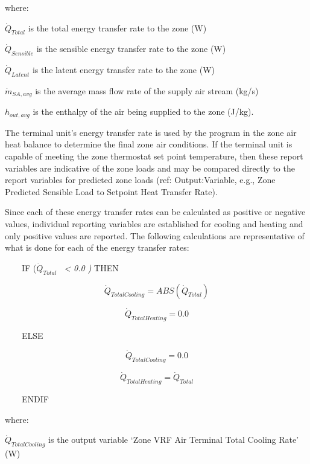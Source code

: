 where:

\(\dot{Q}_{Total}\) is the total energy transfer rate to the zone (W)

\(\dot{Q}_{Sensible}\) is the sensible energy transfer rate to the zone (W)

\(\dot{Q}_{Latent}\) is the latent energy transfer rate to the zone (W)

\(\dot{m}_{SA,avg}\) is the average mass flow rate of the supply air stream (kg/s)

\(h_{out,avg}\) is the enthalpy of the air being supplied to the zone (J/kg).

The terminal unit's energy transfer rate is used by the program in the zone air heat balance to determine the final zone air conditions. If the terminal unit is capable of meeting the zone thermostat set point temperature, then these report variables are indicative of the zone loads and may be compared directly to the report variables for predicted zone loads (ref: Output:Variable, e.g., Zone Predicted Sensible Load to Setpoint Heat Transfer Rate).

Since each of these energy transfer rates can be calculated as positive or negative values, individual reporting variables are established for cooling and heating and only positive values are reported. The following calculations are representative of what is done for each of the energy transfer rates:

~~~~IF (\({\dot Q_{Total}}\) \emph{~\textless{} 0.0 )} THEN

\begin{equation}
{\dot Q_{TotalCooling}} = ABS ({\dot Q_{Total}})
\end{equation}

\begin{equation}
{\dot Q_{TotalHeating}} = 0.0
\end{equation}

~~~~ELSE

\begin{equation}
{\dot Q_{TotalCooling}} = 0.0
\end{equation}

\begin{equation}
{\dot Q_{TotalHeating}} = {\dot Q_{Total}}
\end{equation}

~~~~ENDIF

where:

\(\dot{Q}_{TotalCooling}\) is the output variable `Zone VRF Air Terminal Total Cooling Rate' (W)

